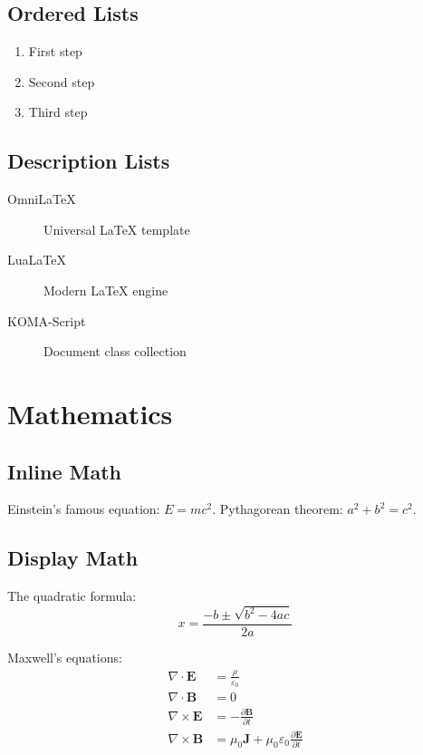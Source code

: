 \documentclass[
    language=english,
    institution=none,        %
    oneside,                 %
]{../../omnilatex}
\begin{document}
\section{Ordered Lists}

\begin{enumerate}
    \item First step
    \item Second step
    \item Third step
\end{enumerate}

\section{Description Lists}

\begin{description}
    \item[OmniLaTeX] Universal LaTeX template
    \item[LuaLaTeX] Modern LaTeX engine
    \item[KOMA-Script] Document class collection
\end{description}

\chapter{Mathematics}

\section{Inline Math}

Einstein's famous equation: $E = mc^2$.
Pythagorean theorem: $a^2 + b^2 = c^2$.

\section{Display Math}

The quadratic formula:
\begin{equation}
    x = \frac{-b \pm \sqrt{b^2 - 4ac}}{2a}
    \label{eq:quadratic}
\end{equation}

Maxwell's equations:
\begin{align}
    \nabla \cdot \mathbf{E}  & = \frac{\rho}{\varepsilon_0}                                                   \\
    \nabla \cdot \mathbf{B}  & = 0                                                                            \\
    \nabla \times \mathbf{E} & = -\frac{\partial \mathbf{B}}{\partial t}                                      \\
    \nabla \times \mathbf{B} & = \mu_0 \mathbf{J} + \mu_0\varepsilon_0 \frac{\partial \mathbf{E}}{\partial t}
\end{align}
\end{document}
